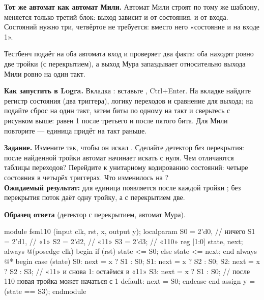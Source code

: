 \textbf{Тот же автомат как автомат Мили.} Автомат Мили строят по тому же
шаблону, меняется только третий блок: выход зависит и от состояния, и от
входа. Состояний нужно три, четвёртое не требуется: вместо него «состояние
 и на входе 1».


Тестбенч  подаёт на оба автомата вход  и
проверяет два факта: оба находят ровно две тройки  (с
перекрытием), а выход Мура запаздывает относительно выхода Мили ровно на
один такт.

\textbf{Как запустить в Logra.} Вкладка : вставьте ,
Ctrl+Enter. На вкладке  найдите регистр состояния (два триггера),
логику переходов и сравнение для выхода; на  подайте сброс
на один такт, затем биты  по одному на такт и
сверьтесь с рисунком выше:  равен 1 после третьего и после пятого
бита. Для Мили повторите --- единица придёт на такт раньше.

\begin{diybox}
\textbf{Задание.}  Измените  так, чтобы он искал
.  Сделайте детектор \emph{без} перекрытия: после
найденной тройки автомат начинает искать с нуля. Чем отличаются таблицы
переходов?  Перейдите к унитарному кодированию состояний:
четыре состояния в четырёх триггерах. Что изменилось на ?\\
\textbf{Ожидаемый результат:} для  единица появляется после
каждой тройки ; без перекрытия поток  даёт одну
тройку, а с перекрытием две.
\end{diybox}

\textbf{Образец ответа} (детектор  с перекрытием, автомат Мура).
\begin{vcode}
module fsm110 (input clk, rst, x, output y);
    localparam S0 = 2'd0,    // ничего
               S1 = 2'd1,    // «1»
               S2 = 2'd2,    // «11»
               S3 = 2'd3;    // «110»
    reg [1:0] state, next;
    always @(posedge clk) begin
        if (rst) state <= S0;
        else     state <= next;
    end
    always @* begin
        case (state)
            S0:      next = x ? S1 : S0;
            S1:      next = x ? S2 : S0;
            S2:      next = x ? S2 : S3;   // «11» и снова 1: остаёмся в «11»
            S3:      next = x ? S1 : S0;   // после 110 новая тройка может начаться с 1
            default: next = S0;
        endcase
    end
    assign y = (state == S3);
endmodule
\end{vcode}

